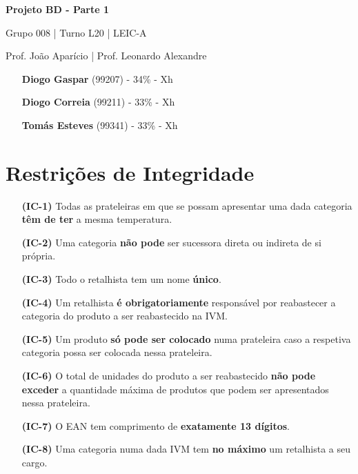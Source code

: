 \documentclass[12pt,a4paper]{article}
\begin{document}
  \begin{titlepage}
    \begin{center}
      \vspace*{5cm}
    
      \Huge
      \textbf{Projeto BD - Parte 1}

      \vspace{0.5cm}
      \LARGE
      Grupo 008 | Turno L20 | LEIC-A

      \vspace{0.5cm}
      \large
      Prof. João Aparício | Prof. Leonardo Alexandre

      \vfill
    \end{center}
    \large
    \begin{itemize}
      \item[] \textbf{Diogo Gaspar} (99207) - 34\% - Xh
      \item[] \textbf{Diogo Correia} (99211) - 33\% - Xh
      \item[] \textbf{Tomás Esteves} (99341) - 33\% - Xh
    \end{itemize}
  \end{titlepage}

  \begin{landscape}
    
  \end{landscape}

  \section*{Restrições de Integridade}
  \footnotesize
  \begin{itemize}
    \item[\textbf{(IC-1)}] Todas as prateleiras em que se possam apresentar uma dada categoria
      \textbf{têm de ter} a mesma temperatura.
		\item[\textbf{(IC-2)}] Uma categoria \textbf{não pode} ser sucessora direta
			ou indireta de si própria.
		\item[\textbf{(IC-3)}] Todo o retalhista tem um nome \textbf{único}.
		\item[\textbf{(IC-4)}] Um retalhista \textbf{é obrigatoriamente} responsável por
			reabastecer a categoria do produto a ser reabastecido na IVM.
		\item[\textbf{(IC-5)}] Um produto \textbf{só pode ser colocado} numa prateleira
			caso a respetiva categoria possa ser colocada nessa prateleira.
		\item[\textbf{(IC-6)}] O total de unidades do produto a ser reabastecido
			\textbf{não pode exceder} a quantidade máxima de produtos que podem ser apresentados nessa prateleira.
		\item[\textbf{(IC-7)}] O EAN tem comprimento de \textbf{exatamente 13 dígitos}.
		\item[\textbf{(IC-8)}] Uma categoria numa dada IVM tem \textbf{no máximo}
			um retalhista a seu cargo.
  \end{itemize}
\end{document}
